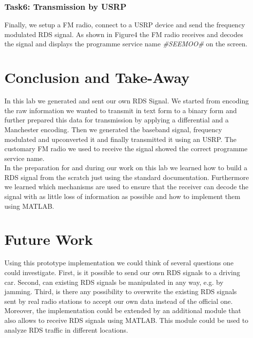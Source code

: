 \documentclass[sigconf]{acmart}
\begin{document}
\hypertarget{Task6:ux20Transmission by USRPux20}{%
\subsubsection{Task6: Transmission by USRP}
\label{Task6:ux20Transmission by USRPux20}}
Finally, we setup a FM radio, connect to a USRP device and send the frequency modulated RDS signal.
As shown in Figure4 the FM radio receives and decodes the signal and displays the programme service
name \textit{\#SEEMOO\#} on the screen.

\section{Conclusion and Take-Away}
In this lab we generated and sent our own RDS Signal. We started from encoding the raw information
we wanted to transmit in text form to a binary form and further prepared this data for transmission by
applying a differential and a Manchester encoding. Then we generated the baseband signal, frequency
modulated and upconverted it and finally transmitted it using an USRP. The customary FM radio we used
to receive the signal showed the correct programme service name.\\
In the preparation for and during our work on this lab we learned how to build a RDS signal from the scratch
just using the standard documentation. Furthermore we learned which mechanisms are used to ensure that
the receiver can decode the signal with as little loss of information as possible and how to implement them
using MATLAB.

\section{Future Work}
Using this prototype implementation we could think of several questions one could investigate. First, is it
possible to send our own RDS signals to a driving car. Second, can existing RDS signals be manipulated
in any way, e.g. by jamming. Third, is there any possibility to overwrite the existing RDS signals sent by
real radio stations to accept our own data instead of the official one.
Moreover, the implementation could be extended by an additional module that also allows to receive
RDS signals using MATLAB. This module could be used to analyze RDS traffic in different locations.




 
\end{document}
